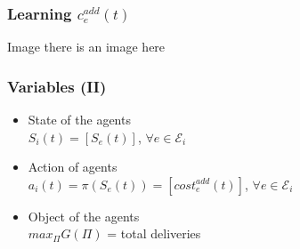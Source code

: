 \documentclass{beamer}
\begin{document}
	\begin{frame}
		\frametitle{Learning $c_e^{add}(t)$}
		Image there is an image here
	\end{frame}
	\begin{frame}
		\frametitle{Variables (II)}
		\begin{itemize}
			\item State of the agents\\ $S_i(t) = [S_e(t)]$, $\forall e \in \mathcal{E}_i$


			\item Action of agents\\ $a_i(t) = \pi(S_e(t)) = [cost_e^{add}(t)]$, $\forall e \in \mathcal{E}_i$


			\item Object of the agents\\ $max_\Pi G(\Pi)$ = total deliveries
		\end{itemize}
	\end{frame}
\end{document}
